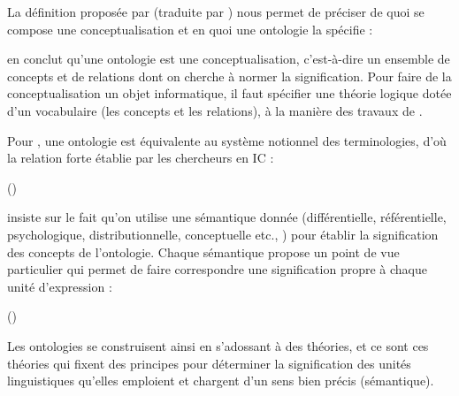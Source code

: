  La définition proposée par \cite{Uschold1996} (traduite par \citeauthor{Charlet2002}) nous permet de préciser de quoi se compose une conceptualisation et en quoi une ontologie la spécifie : 



\citeauthor{Charlet2002} en conclut qu'une ontologie est une conceptualisation, c'est-à-dire un ensemble de concepts et de relations dont on cherche à normer la signification. 
Pour faire de la conceptualisation un objet informatique, il faut spécifier une théorie logique dotée d'un vocabulaire (les concepts et les relations), à la manière des travaux de \cite{Guarino1995}.

Pour \citeauthor{Roche2005}, une ontologie est équivalente au système notionnel des terminologies, d'où la relation forte établie par les chercheurs en IC : 

 (\cite{Roche2005})

\citeauthor{Bachimont2000a} insiste sur le fait qu'on utilise une sémantique donnée (différentielle, référentielle, psychologique, distributionnelle, conceptuelle etc., \cite{bachimont:hdr}) pour établir la signification des concepts de l'ontologie. Chaque sémantique propose un point de vue particulier qui permet de faire correspondre une signification propre à chaque unité d'expression : 

 (\cite{Bachimont2000a})

Les ontologies se construisent ainsi en s'adossant à des théories, et ce sont ces théories qui fixent des principes pour déterminer la signification des unités linguistiques qu'elles emploient et chargent d'un sens bien précis (sémantique). 

